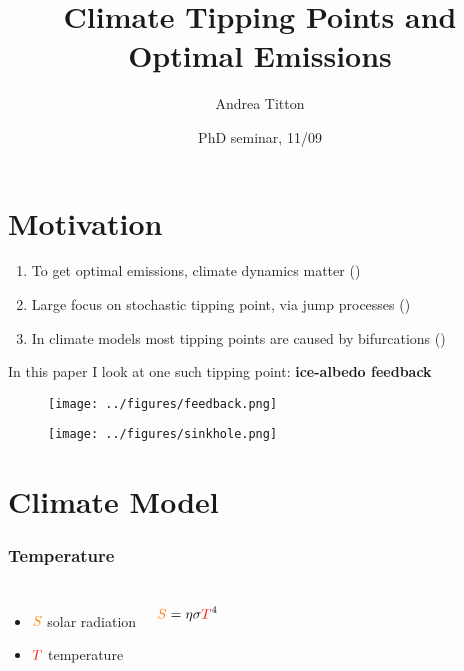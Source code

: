 \documentclass[pdf]{beamer}
\author{Andrea Titton}
\title[Climate Tipping Points and Optimal Emissions]{\small Climate Tipping Points and\\ Optimal Emissions}
\institute{CeNDEF, University of Amsterdam}
\date{PhD seminar, 11/09}
\begin{document}
\frame[plain]{\titlepage}

\section{Motivation}
\begin{frame}
    \begin{enumerate}
        \item To get optimal emissions, climate dynamics matter (\cite{dietz_are_2020, dietz_economic_2021})
        \pause \item Large focus on stochastic tipping point, via jump processes (\cite{van_den_bremer_risk-adjusted_2021,lin_social_2023})
        \pause \item In climate models most tipping points are caused by bifurcations (\cite{ashwin_tipping_2012,ashwin_extreme_2020})
    \end{enumerate}
\end{frame}

\begin{frame}
    In this paper I look at one such tipping point: \textbf{ice-albedo feedback}

    \pause \begin{figure}
        \centering
        \texttt{[image: ../figures/feedback.png]}
    \end{figure}
\end{frame}


\begin{frame}
    \centering
    \begin{figure}
        \texttt{[image: ../figures/sinkhole.png]}
    \end{figure}
\end{frame}


\section{Climate Model}

\begin{frame} \frametitle{Temperature}
    \begin{columns}
        \begin{itemize}
            \item ${\color{orange} S}$ solar radiation
            \item ${\color{red} T}$ temperature
        \end{itemize}
        \begin{equation*}
            {\color{orange} S} = \eta \sigma {\color{red} T}^4
        \end{equation*}
    \end{columns}
\end{frame}
\end{document}
